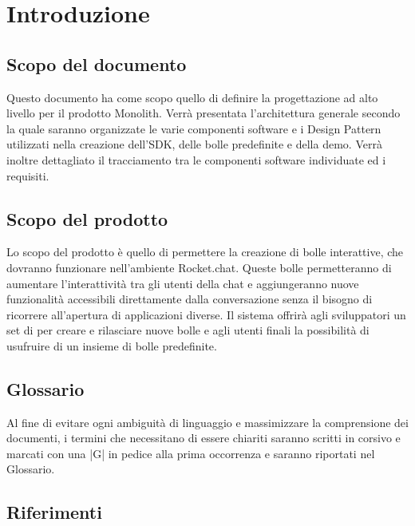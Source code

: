 

\section{Introduzione}
\subsection{Scopo del documento}

Questo documento ha come scopo quello di definire la progettazione ad alto livello
per il prodotto Monolith. Verrà presentata l’architettura generale secondo la quale
saranno organizzate le varie componenti software e i Design Pattern utilizzati nella
creazione dell'SDK, delle bolle predefinite e della demo. Verrà inoltre dettagliato il tracciamento tra le componenti software individuate ed i requisiti.


\subsection{Scopo del prodotto}

Lo scopo del prodotto è quello di permettere la creazione di bolle
interattive, che dovranno funzionare nell’ambiente Rocket.chat. Queste
bolle permetteranno di aumentare l'interattività tra gli utenti della
chat e aggiungeranno nuove funzionalità accessibili direttamente dalla conversazione 
senza il bisogno di ricorrere all'apertura di applicazioni diverse.
Il sistema offrirà agli sviluppatori un set di  per creare e
rilasciare nuove bolle e agli utenti finali la possibilità di
usufruire di un insieme di bolle predefinite.


\subsection{Glossario}

Al fine di evitare ogni ambiguità di linguaggio e massimizzare la
comprensione dei documenti, i termini che necessitano di essere
chiariti saranno scritti in corsivo e marcati con una |G| in pedice alla prima
occorrenza e saranno riportati nel Glossario.

\subsection{Riferimenti}

